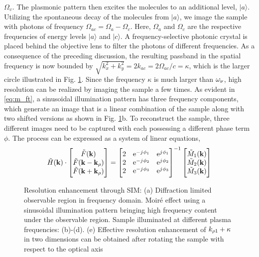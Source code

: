 \documentclass[12pt]{article}
\begin{document}
$\Omega_{\upsilon}$. The plasmonic pattern then excites the molecules to an
additional level, $|a\rangle$. Utilizing the spontaneous decay of the molecules from $|a\rangle$, we image the sample with photons of frequency $\Omega_{ac} = \Omega_{a}-\Omega_{c}$. Here, $\Omega_{a}$ and $\Omega_{c}$ are the respective frequencies of energy levels $|a\rangle$ and $|c\rangle$. A frequency-selective photonic crystal is placed behind the objective lens to filter the photons of different frequencies. As a consequence of the preceding discussion, the resulting passband in the spatial frequency is now bounded by $\sqrt{k_x^2 + k_y^2} = 2 k_{ac} = 2 \Omega_{ac}/c = \kappa$, which is the larger circle illustrated in Fig. \ref{fig:sim}. Since the frequency $\kappa$ is much larger than $\omega_{\nu}$, high resolution can be realized by imaging the sample a few times.
%
As evident in \eqref{eq:m_ft}, a sinusoidal illumination pattern has three frequency components, which generate an image that is a linear combination of the sample along with two shifted versions as shown in Fig. \ref{fig:sim}b. To reconstruct the sample, three different images need to be captured with each possessing a different phase term $\phi$. The process can be expressed as a system of linear equations,
%
\begin{equation}
  \tilde{H}(\mathbf{k}) \cdot
  \begin{bmatrix}
    \tilde{F}(\mathbf{k}) \\
    \tilde{F}(\mathbf{k} - \mathbf{k}_{\rho}) \\
    \tilde{F}(\mathbf{k} + \mathbf{k}_{\rho})
  \end{bmatrix}
  =
  \begin{bmatrix}
    2 & \mathrm{e}^{-j\mkern1mu \phi_1} & \mathrm{e}^{j\mkern1mu \phi_1} \\
    2 & \mathrm{e}^{-j\mkern1mu \phi_2} & \mathrm{e}^{j\mkern1mu \phi_2} \\
    2 & \mathrm{e}^{-j\mkern1mu \phi_3} & \mathrm{e}^{j\mkern1mu \phi_3} \\
  \end{bmatrix}^{-1}
  \begin{bmatrix}
   \tilde{M}_1(\mathbf{k}) \\
   \tilde{M}_2(\mathbf{k}) \\
   \tilde{M}_3(\mathbf{k})
  \end{bmatrix}
  \label{eq:reconstruction_algo}
\end{equation}
%
\begin{figure}[t!]
  \centering
  \def\svgwidth{.75\linewidth}
  
  \caption{Resolution enhancement through SIM: (a) Diffraction limited observable region in frequency domain.  Moiré effect using a sinusoidal illumination pattern bringing high frequency content under the observable region. Sample illuminated at different plasma frequencies: (b)-(d). (e) Effective resolution enhancement of $k_{\rho 1} + \kappa$ in two dimensions can be obtained after rotating the sample with respect to the optical axis}
  \label{fig:sim}
\end{figure}
\end{document}
